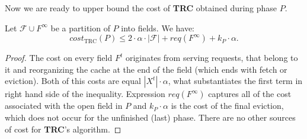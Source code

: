 Now we are ready to upper bound the cost of \textbf{TRC} obtained during phase $P$.
\begin{lemma}
Let $\mathcal{F} \cup F^{\infty}$ be a partition of $P$ into fields. We have:
$$cost_{\mathrm{TRC}}(P) \leq 2 \cdot \alpha \cdot |\mathcal{F}| + 
req(F^{\infty}) + k_P \cdot 
\alpha.$$ 
\label{thm:trc_cost}
\end{lemma}
\begin{proof}
The cost on every field $F^t$ originates from serving requests, that belong 
to it and reorganizing the cache at the end of the field (which ends with fetch or 
eviction). Both of this costs are equal 
$|X^t| \cdot \alpha$, what substantiates the first term in right hand side of the 
inequality. Expression $req(F^{\infty})$ captures all of the cost associated 
with the open field in $P$ and $k_P \cdot \alpha$ is the cost of the final eviction, 
which does not occur for the unfinished (last) phase. There are no other sources of
cost for \textbf{TRC}'s algorithm.
\end{proof}

